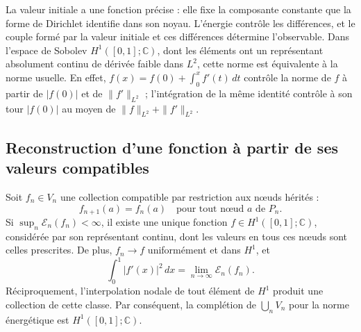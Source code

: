 La valeur initiale a une fonction précise : elle fixe la composante constante
que la forme de Dirichlet identifie dans son noyau. L’énergie contrôle
les différences, et le couple formé par la valeur initiale et ces différences
détermine l’observable. Dans l’espace de Sobolev
\(H^1([0,1];\mathbb C)\), dont les éléments ont un représentant
absolument continu de dérivée faible dans \(L^2\), cette norme est
équivalente à la norme usuelle. En effet,
\(f(x)=f(0)+\int_0^xf'(t)\,dt\) contrôle la norme de \(f\) à
partir de \(|f(0)|\) et de \(\|f'\|_{L^2}\) ; l’intégration de la
même identité contrôle à son tour \(|f(0)|\) au moyen de
\(\|f\|_{L^2}+\|f'\|_{L^2}\).

\subsection{Reconstruction d’une fonction à partir de ses valeurs compatibles}

\begin{theorem}
\label{thm:limite-energia-h1-k}
Soit \(f_n\in V_n\) une collection compatible par restriction aux nœuds hérités :
\[
 f_{n+1}(a)=f_n(a)
 \quad\text{pour tout nœud }a\text{ de }P_n.
\]
Si \(\sup_n\mathcal E_n(f_n)<\infty\), il existe une unique fonction
\(f\in H^1([0,1];\mathbb C)\), considérée par son représentant
continu, dont les valeurs en tous ces nœuds sont celles prescrites. De plus,
\(f_n\to f\) uniformément et dans \(H^1\), et
\begin{equation}
 \int_0^1|f'(x)|^2\,dx
 =\lim_{n\to\infty}\mathcal E_n(f_n).
 \label{eq:limite-energia-h1-k}
\end{equation}
Réciproquement, l'interpolation nodale de tout élément de \(H^1\) produit une collection de cette classe. Par conséquent, la complétion de \(\bigcup_n V_n\) pour la norme énergétique est \(H^1([0,1];\mathbb C)\).
\end{theorem}

